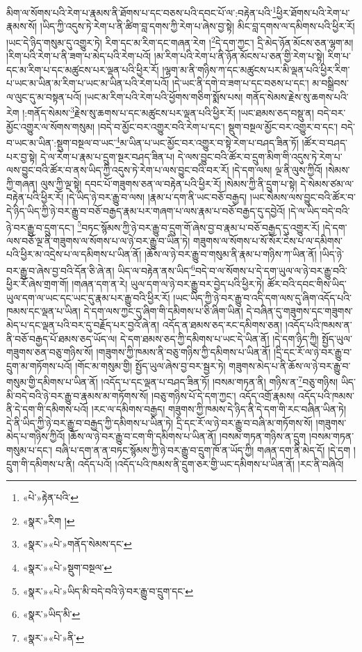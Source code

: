 མིག་ལ་སོགས་པའི་རེག་པ་རྣམས་ནི་ཐོགས་པ་དང་བཅས་པའི་དབང་པོ་ལ་:བརྟེན་པའི་\footnote{«པེ་»རྟེན་པའི་}ཕྱིར་ཐོགས་པའི་རེག་པ་རྣམས་སོ། །ཡིད་ཀྱི་འདུས་ཏེ་རེག་པ་ནི་ཚིག་བླ་དགས་ཀྱི་རེག་པ་ཞེས་བྱ་སྟེ། མིང་བླ་དགས་ལ་དམིགས་པའི་ཕྱིར་རོ། །ཡང་དེ་ཉིད་གསུམ་དུ་འགྱུར་ཏེ། རིག་དང་མ་རིག་དང་གཞན་རེག །\footnote{«སྣར་»རིག །}དེ་དག་ཀྱང་། དྲི་མེད་ཉོན་མོངས་ཅན་ལྷག་མ། །རིག་པའི་རེག་པ་ནི་ཟག་པ་མེད་པའི་རེག་པའོ། །མ་རིག་པའི་རེག་པ་ནི་ཉོན་མོངས་པ་ཅན་གྱི་རེག་པ་སྟེ། རིག་པ་དང་མ་རིག་པ་དང་མཚུངས་པར་ལྡན་པའི་ཕྱིར་རོ། །ལྷག་མ་ནི་གཉིས་ཀ་དང་མཚུངས་པར་མི་ལྡན་པའི་ཕྱིར་རིག་པ་ཡང་མ་ཡིན་མ་རིག་པ་ཡང་མ་ཡིན་པའི་རེག་པའོ། །དེ་ཡང་ནི་དགེ་བ་ཟག་པ་དང་བཅས་པ་དང་། མ་བསྒྲིབས་ལ་ལུང་དུ་མ་བསྟན་པའོ། །ཡང་མ་རིག་པའི་རེག་པའི་ཕྱོགས་གཅིག་སྨོས་པས། གནོད་སེམས་རྗེས་སུ་ཆགས་པའི་རེག །:གནོད་སེམས་\footnote{«སྣར་»«པེ་»གནོད་སེམས་དང་}རྗེས་སུ་ཆགས་པ་དང་མཚུངས་པར་ལྡན་པའི་ཕྱིར་རོ། །ཡང་ཐམས་ཅད་བསྡུ་ན། བདེ་བར་མྱོང་འགྱུར་ལ་སོགས་གསུམ། །བདེ་བ་མྱོང་བར་འགྱུར་བའི་རེག་པ་དང་། སྡུག་བསྔལ་མྱོང་བར་འགྱུར་བ་དང་། བདེ་བ་ཡང་མ་ཡིན་:སྡུག་བསྔལ་བ་ཡང་\footnote{«སྣར་»«པེ་»སྡུག་བསྔལ་}མ་ཡིན་པ་ཡང་མྱོང་བར་འགྱུར་བ་སྟེ་རེག་པ་བཤད་ཟིན་ཏོ། །ཚོར་བ་བཤད་པར་བྱ་སྟེ། དེ་ལ་རེག་པ་རྣམ་པ་དྲུག་སྔར་བཤད་ཟིན་པ། དེ་ལས་བྱུང་བའི་ཚོར་བ་དྲུག་མིག་གི་འདུས་ཏེ་རེག་པ་ལས་བྱུང་བའི་ཚོར་བ་ནས་ཡིད་ཀྱི་འདུས་ཏེ་རེག་པ་ལས་བྱུང་བའི་བར་རོ། །དེ་དག་ལས། ལྔ་ནི་ལུས་ཀྱིའོ། །སེམས་ཀྱི་གཞན། ལུས་ཀྱི་ལྔ་སྟེ། དབང་པོ་གཟུགས་ཅན་ལ་བརྟེན་པའི་ཕྱིར་རོ། །སེམས་ཀྱི་ནི་དྲུག་པ་སྟེ། དེ་སེམས་ཙམ་ལ་བརྟེན་པའི་ཕྱིར་རོ། །དེ་ཡིད་ཉེ་བར་རྒྱུ་བ་ལས། །རྣམ་པ་དག་ནི་ཡང་བཅོ་བརྒྱད། །ཡང་སེམས་ལས་བྱུང་བའི་ཚོར་བ་དེ་ཉིད་ཡིད་ཀྱི་ཉེ་བར་རྒྱུ་བ་བཅོ་བརྒྱད་རྣམ་པར་གཞག་པ་ལས་རྣམ་པ་བཅོ་བརྒྱད་དུ་དབྱེའོ། །དེ་ལ་ཡིད་བདེ་བའི་ཉེ་བར་རྒྱུ་བ་དྲུག་དང་། \footnote{«སྣར་»«པེ་»ཡིད་མི་བདེ་བའི་ཉེ་བར་རྒྱུ་བ་དྲུག་དང་}བཏང་སྙོམས་ཀྱི་ཉེ་བར་རྒྱུ་བ་དྲུག་གོ་ཞེས་བྱ་བ་རྣམ་པ་བཅོ་བརྒྱད་དུ་འགྱུར་རོ། །དེ་དག་ལས་བཅོ་ལྔ་ནི་གཟུགས་ལ་སོགས་པ་ལ་ཉེ་བར་རྒྱུ་བ་ཡིན་ཏེ། གཟུགས་ལ་སོགས་པ་སོ་སོར་ངེས་པ་ལ་དམིགས་པའི་ཕྱིར་མ་འདྲེས་པ་ལ་དམིགས་པ་ཡིན་ནོ། །ཆོས་ལ་ཉེ་བར་རྒྱུ་བ་གསུམ་ནི་རྣམ་པ་གཉིས་ཀ་ཡིན་ནོ། །ཡིད་ཉེ་བར་རྒྱུ་བ་ཞེས་བྱ་བའི་དོན་ཅི་ཞེ་ན། ཡིད་ལ་བརྟེན་ནས་ཡིད་\footnote{«སྣར་»ཡིད་མི་}བདེ་བ་ལ་སོགས་པ་དེ་དག་ཡུལ་ལ་ཉེ་བར་རྒྱུ་བའི་ཕྱིར་རོ་ཞེས་གྲག་གོ། །གཞན་དག་ན་རེ། ཡུལ་དག་ལ་ཉེ་བར་རྒྱུ་བར་བྱེད་པའི་ཕྱིར་ཏེ། ཚོར་བའི་དབང་གིས་ཡིད་ཡུལ་དག་ལ་ཡང་དང་ཡང་དུ་རྣམ་པར་རྒྱུ་བའི་ཕྱིར་རོ། །ཡང་ཡིད་ཀྱི་ཉེ་བར་རྒྱུ་བ་འདི་དག་ལས་དུ་ཞིག་འདོད་པའི་ཁམས་དང་ལྡན་པ་ཡིན། དེ་དག་ལས་ཀྱང་དུ་ཞིག་གི་དམིགས་པ་ཅི་ཞིག་ཡིན། དེ་བཞིན་དུ་གཟུགས་དང་གཟུགས་མེད་པ་དང་ལྡན་པའི་བར་དུ་བརྗོད་པར་བྱའོ་ཞེ་ན། འདོད་ན་ཐམས་ཅད་རང་དམིགས་ཅན། །འདོད་པའི་ཁམས་ན་ནི་བཅོ་བརྒྱད་པོ་ཐམས་ཅད་ཡོད་ལ། དེ་དག་ཐམས་ཅད་ཀྱི་དམིགས་པ་ཡང་དེ་ཡིན་ནོ། །དེ་དག་ཉིད་ཀྱི། སྤྱོད་ཡུལ་གཟུགས་ཅན་བཅུ་གཉིས་སོ། །གཟུགས་ཀྱི་ཁམས་ནི་བཅུ་གཉིས་ཀྱི་དམིགས་པ་ཡིན་ནོ། །དྲི་དང་རོ་ལ་ཉེ་བར་རྒྱུ་བ་དྲུག་མ་གཏོགས་པའོ། །གོང་མ་གསུམ་གྱི། སྤྱོད་ཡུལ་ཞེས་བྱ་བར་སྦྱར་ཏེ། གཟུགས་མེད་པ་ནི་ཆོས་ལ་ཉེ་བར་རྒྱུ་བ་གསུམ་གྱི་དམིགས་པ་ཡིན་ནོ། །འདོད་པ་དང་ལྡན་པ་བཤད་ཟིན་ཏོ། །བསམ་གཏན་ནི། གཉིས་ན་\footnote{«སྣར་»«པེ་»ནི་}བཅུ་གཉིས། ཡིད་མི་བདེ་བའི་ཉེ་བར་རྒྱུ་བ་རྣམས་མ་གཏོགས་སོ། །བཅུ་གཉིས་པོ་དེ་དག་ཀྱང་། འདོད་འགྲོ་རྣམས། འདོད་པའི་ཁམས་ནི་དེ་དག་གི་དམིགས་པའོ། །རང་ལ་དམིགས་བརྒྱད། གཟུགས་ཀྱི་ཁམས་དེ་ཉིད་ནི་དེ་དག་གི་རང་བཞིན་ཡིན་ཏེ། དེ་ནི་ཡིད་ཀྱི་ཉེ་བར་རྒྱུ་བ་བརྒྱད་ཀྱི་དམིགས་པ་ཡིན་ཏེ། དྲི་དང་རོ་ལ་ཉེ་བར་རྒྱུ་བ་བཞི་མ་གཏོགས་སོ། །གཟུགས་མེད་པ་གཉིས་ཀྱིའོ། །ཆོས་ལ་ཉེ་བར་རྒྱུ་བ་ངག་གི་དམིགས་པ་ཡིན་ནོ། །བསམ་གཏན་གཉིས་ན་དྲུག །བསམ་གཏན་གསུམ་པ་དང་། བཞི་པ་དག་ན་ན་བཏང་སྙོམས་ཀྱི་ཉེ་བར་རྒྱུ་བ་དྲུག་ཁོ་ན་ཡོད་ཀྱི། གཞན་དག་ནི་མེད་དོ། །དེ་དག །དྲུག་གི་དམིགས་པ་ནི། འདོད་པའོ། །འདོད་པའི་ཁམས་ནི་དྲུག་ཅར་གྱི་ཡང་དམིགས་པ་ཡིན་ནོ། །རང་ནི་བཞིའོ། 